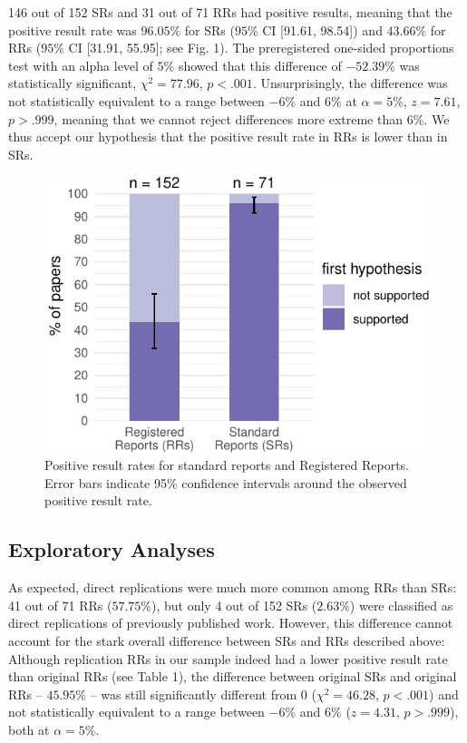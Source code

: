 \documentclass[british,,man,floatsintext]{apa6}
\begin{document}
146 out of 152 SRs and 31 out of 71 RRs had positive results, meaning that the positive result rate was \(96.05 \%\) for SRs (\(95 \%\) CI {[}91.61, 98.54{]}) and \(43.66 \%\) for RRs (\(95 \%\) CI {[}31.91, 55.95{]}; see Fig. 1).
The preregistered one-sided proportions test with an alpha level of \(5\%\) showed that this difference of \(-52.39\%\) was statistically significant, \(\chi^2 = 77.96\), \(p < .001\).
Unsurprisingly, the difference was not statistically equivalent to a range between \(-6\%\) and \(6\%\) at \(\alpha = 5\%\), \(z = 7.61\), \(p > .999\), meaning that we cannot reject differences more extreme than \(6\%\).
We thus accept our hypothesis that the positive result rate in RRs is lower than in SRs.

\begin{figure}
\centering
\includegraphics{manuscript_files/figure-latex/unnamed-chunk-3-1.pdf}
\caption{\label{fig:unnamed-chunk-3}Positive result rates for standard reports and Registered Reports. Error bars indicate 95\% confidence intervals around the observed positive result rate.}
\end{figure}

\hypertarget{exploratory-analyses}{%
\subsection{Exploratory Analyses}\label{exploratory-analyses}}

As expected, direct replications were much more common among RRs than SRs: 41 out of 71 RRs (\(57.75\%\)), but only 4 out of 152 SRs (\(2.63\%\)) were classified as direct replications of previously published work.
However, this difference cannot account for the stark overall difference between SRs and RRs described above:
Although replication RRs in our sample indeed had a lower positive result rate than original RRs (see Table 1), the difference between original SRs and original RRs -- \(45.95\%\) -- was still significantly different from 0 (\(\chi^2 = 46.28\), \(p < .001\)) and not statistically equivalent to a range between \(-6\%\) and \(6\%\) (\(z = 4.31\), \(p > .999\)), both at \(\alpha = 5\%\).
\end{document}
